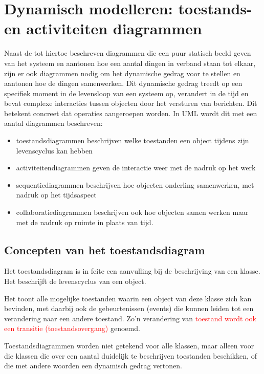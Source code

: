 \section{Dynamisch modelleren: toestands- en activiteiten diagrammen}


Naast de tot hiertoe beschreven diagrammen die een puur statisch beeld geven van het systeem en aantonen hoe een aantal dingen in verband staan tot elkaar, zijn er ook diagrammen nodig om het dynamische gedrag voor te stellen en aantonen hoe de dingen samenwerken. Dit dynamische gedrag treedt op een specifiek moment in de levensloop van een systeem op, verandert in de tijd en bevat complexe interacties tussen objecten door het versturen van berichten. Dit betekent concreet dat operaties aangeroepen worden. In UML wordt dit met een aantal diagrammen beschreven:

\begin{itemize}
    \item toestandsdiagrammen beschrijven welke toestanden een object tijdens zijn levenscyclus kan hebben
    \item activiteitendiagrammen geven de interactie weer met de nadruk op het werk
    \item sequentiediagrammen beschrijven hoe objecten onderling samenwerken, met nadruk op het tijdsaspect
    \item collaboratiediagrammen beschrijven ook hoe objecten samen werken maar met de nadruk op ruimte in plaats van tijd.
\end{itemize}


\subsection{Concepten van het toestandsdiagram}

Het toestandsdiagram is in feite een aanvulling bij de beschrijving van een klasse. Het beschrijft de levenscyclus van een object. 

Het toont alle mogelijke toestanden waarin een object van deze klasse zich kan bevinden, met daarbij ook de gebeurtenissen (events) die kunnen leiden tot een verandering naar een andere toestand. Zo'n verandering van \textcolor{red}{toestand wordt ook een transitie (toestandsovergang)} genoemd. 

Toestandsdiagrammen worden niet getekend voor alle klassen, maar alleen voor die klassen die over een aantal duidelijk te beschrijven toestanden beschikken, of die met andere woorden een dynamisch gedrag vertonen. 

